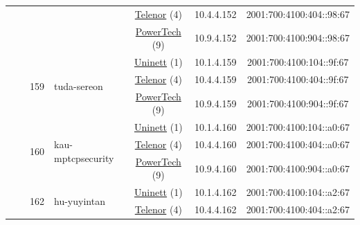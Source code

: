 \begin{small}
\begin{center}
\begin{longtable}{|c|c|c|c|c|c|c|c|}
  &  &  &  & \multicolumn{2}{|c|}{\tiny{\href{https://www.telenor.no}{Telenor} (4)}} & \tiny{10.4.4.152} & \tiny{2001:700:4100:404::98:67} \\* \cline{5-5}\cline{6-6}\cline{7-7}\cline{8-8}
  &  &  &  & \multicolumn{2}{|c|}{\tiny{\href{http://www.powertech.no}{PowerTech} (9)}} & \tiny{10.9.4.152} & \tiny{2001:700:4100:904::98:67} \\* \cline{3-3}\cline{4-4}\cline{5-5}\cline{6-6}\cline{7-7}\cline{8-8}
  &  & \multirow{3}{*}{\tiny{159}} & \multicolumn{1}{|l|}{\multirow{3}{*}{\tiny{tuda-sereon}}} & \multicolumn{2}{|c|}{\tiny{\href{https://www.uninett.no}{Uninett} (1)}} & \tiny{10.1.4.159} & \tiny{2001:700:4100:104::9f:67} \\* \cline{5-5}\cline{6-6}\cline{7-7}\cline{8-8}
  &  &  &  & \multicolumn{2}{|c|}{\tiny{\href{https://www.telenor.no}{Telenor} (4)}} & \tiny{10.4.4.159} & \tiny{2001:700:4100:404::9f:67} \\* \cline{5-5}\cline{6-6}\cline{7-7}\cline{8-8}
  &  &  &  & \multicolumn{2}{|c|}{\tiny{\href{http://www.powertech.no}{PowerTech} (9)}} & \tiny{10.9.4.159} & \tiny{2001:700:4100:904::9f:67} \\* \cline{3-3}\cline{4-4}\cline{5-5}\cline{6-6}\cline{7-7}\cline{8-8}
  &  & \multirow{3}{*}{\tiny{160}} & \multicolumn{1}{|l|}{\multirow{3}{*}{\tiny{kau-mptcpsecurity}}} & \multicolumn{2}{|c|}{\tiny{\href{https://www.uninett.no}{Uninett} (1)}} & \tiny{10.1.4.160} & \tiny{2001:700:4100:104::a0:67} \\* \cline{5-5}\cline{6-6}\cline{7-7}\cline{8-8}
  &  &  &  & \multicolumn{2}{|c|}{\tiny{\href{https://www.telenor.no}{Telenor} (4)}} & \tiny{10.4.4.160} & \tiny{2001:700:4100:404::a0:67} \\* \cline{5-5}\cline{6-6}\cline{7-7}\cline{8-8}
  &  &  &  & \multicolumn{2}{|c|}{\tiny{\href{http://www.powertech.no}{PowerTech} (9)}} & \tiny{10.9.4.160} & \tiny{2001:700:4100:904::a0:67} \\* \cline{3-3}\cline{4-4}\cline{5-5}\cline{6-6}\cline{7-7}\cline{8-8}
  &  & \multirow{3}{*}{\tiny{162}} & \multicolumn{1}{|l|}{\multirow{3}{*}{\tiny{hu-yuyintan}}} & \multicolumn{2}{|c|}{\tiny{\href{https://www.uninett.no}{Uninett} (1)}} & \tiny{10.1.4.162} & \tiny{2001:700:4100:104::a2:67} \\* \cline{5-5}\cline{6-6}\cline{7-7}\cline{8-8}
  &  &  &  & \multicolumn{2}{|c|}{\tiny{\href{https://www.telenor.no}{Telenor} (4)}} & \tiny{10.4.4.162} & \tiny{2001:700:4100:404::a2:67} \\* \cline{5-5}\cline{6-6}\cline{7-7}\cline{8-8}

\end{longtable}
\end{center}
\end{small}
